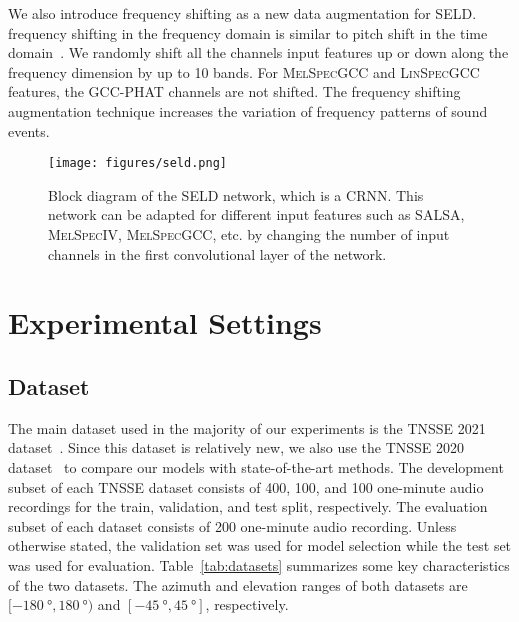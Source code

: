 \documentclass[journal]{IEEEtran}
\begin{document}
We also introduce frequency shifting as a new data augmentation for SELD. frequency shifting in  the frequency domain is similar to pitch shift in the time domain~\cite{Salamon2017DeepClassification}. We randomly shift all the channels input features up or down along the frequency dimension by up to \num{10} bands. For \textsc{MelSpecGCC} and \textsc{LinSpecGCC} features, the GCC-PHAT channels are not shifted. The frequency shifting augmentation technique increases the variation of frequency patterns of sound events.  

\begin{figure}[t]
\centering
\texttt{[image: figures/seld.png]}
\caption{Block diagram of the SELD network, which is a CRNN. This network can be adapted for different input features such as SALSA, \textsc{MelSpecIV}, \textsc{MelSpecGCC}, etc. by changing the number of input channels in the first convolutional layer of the network. }
\label{fig:seldnet}
\end{figure}  \section{Experimental Settings}
\label{sec:exp}

\subsection{Dataset}
\label{sec:dataset}

The main dataset used in the majority of our experiments is the TNSSE 2021 dataset~\cite{Politis2021}. Since this dataset is relatively new, we also use the TNSSE 2020 dataset~\cite{Politis2020ADetection} to compare our models with state-of-the-art methods. The development subset of each TNSSE dataset consists of \num{400}, \num{100}, and \num{100} one-minute audio recordings for the train, validation, and test split, respectively. The evaluation subset of each dataset consists of \num{200} one-minute audio recording. Unless otherwise stated, the validation set was used for model selection while the test set was used for evaluation. Table~\ref{tab:datasets} summarizes some key characteristics of the two datasets. The azimuth and elevation ranges of both datasets are $[\SI{-180}{\degree}, \SI{180}{\degree})$ and $[\SI{-45}{\degree}, \SI{45}{\degree}]$, respectively.  
\end{document}
